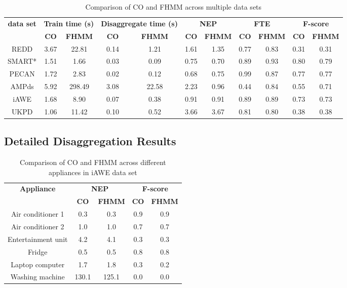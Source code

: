 \documentclass{sig-alternate}
\begin{document}
\begin{table}
\centering
\begin{tabular}{ccccccccccc}
\hline\textbf{data set} & \multicolumn{2}{c}{\textbf{Train time (s)}}& \multicolumn{2}{c}{\textbf{Disaggregate time (s)}} &\multicolumn{2}{c}{\textbf{NEP}}    & \multicolumn{2}{c}{\textbf{FTE}} &\multicolumn{2}{c}{\textbf{F-score}} \\ 
~ &\textbf{CO} & \textbf{FHMM} &\textbf{CO} & \textbf{FHMM} &\textbf{CO} & \textbf{FHMM} &\textbf{CO} & \textbf{FHMM}&\textbf{CO} & \textbf{FHMM} \\ \hline 
REDD &3.67 &22.81 &0.14 &1.21 &1.61 &1.35 &0.77 &0.83 &0.31 &0.31\\ 
SMART* &1.51 &1.66 &0.03 &0.09 &0.75 &0.70 &0.89 &0.93 &0.80 &0.79\\ 
PECAN &1.72 &2.83 &0.02 &0.12 &0.68 &0.75 &0.99 &0.87 &0.77 &0.77\\ 
AMPds &5.92 &298.49 &3.08 &22.58 &2.23 &0.96 &0.44 &0.84 &0.55 &0.71\\ 
iAWE &1.68 &8.90 &0.07 &0.38 &0.91 &0.91 &0.89 &0.89 &0.73 &0.73\\ 
UKPD &1.06 &11.42 &0.10 &0.52 &3.66 &3.67 &0.81 &0.80 &0.38 &0.38\\
\hline
\end{tabular}
\caption{Comparison of CO and FHMM across multiple data sets}
\label{table:disaggregation}
\end{table}

\subsection{Detailed Disaggregation Results}


\begin{table}
    \begin{tabular}{ccccc}
    \hline \textbf{Appliance} & \multicolumn{2}{c}{\textbf{NEP}} & \multicolumn{2}{c}{\textbf{F-score}}\\
    ~                  & \textbf{CO}    & \textbf{FHMM}  & \textbf{CO}      & \textbf{FHMM} \\ \hline
    Air conditioner 1  & 0.3   & 0.3   & 0.9     & 0.9  \\
    Air conditioner 2  & 1.0   & 1.0   & 0.7     & 0.7  \\
    Entertainment unit & 4.2   & 4.1   & 0.3     & 0.3  \\
    Fridge             & 0.5   & 0.5   & 0.8     & 0.8  \\
    Laptop computer    & 1.7   & 1.8   & 0.3     & 0.2  \\
    Washing machine    & 130.1 & 125.1 & 0.0     & 0.0  \\
    \hline \end{tabular}
    \caption{Comparison of CO and FHMM across different appliances in iAWE data set}
\label{table:disaggregation_iawe}
\end{table}
\end{document}
